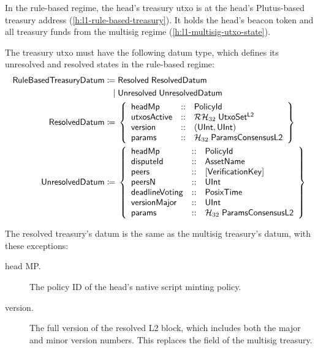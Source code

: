 \documentclass[../hydrozoa.tex]{subfiles}
\begin{document}
In the rule-based regime, the head's treasury utxo is at the head's Plutus-based treasury address (\cref{h:l1-rule-based-treasury}).
It holds the head's beacon token and all treasury funds from the multisig regime (\cref{h:l1-multisig-utxo-state}).

The treasury utxo must have the following datum type, which defines its unresolved and resolved states in the rule-based regime:
\begin{equation*}
\begin{split}
  \mathsf{RuleBasedTreasuryDatum} \coloneq&\;
    \mathsf{Resolved} \; \mathsf{ResolvedDatum} \\\mid&\;
    \mathsf{Unresolved} \; \mathsf{UnresolvedDatum} \\
  \mathsf{ResolvedDatum} \coloneq&\;\left\{
    \begin{array}{lll}
      \mathsf{headMp} &::& \mathsf{PolicyId} \\
      \mathsf{utxosActive}  &::& \mathcal{RH}_{32} \; \mathsf{UtxoSet^{L2}} \\
      \mathsf{version} &::& (\mathsf{UInt}, \mathsf{UInt}) \\
      \mathsf{params} &::& \mathcal{H}_{32} \; \mathsf{ParamsConsensusL2}
    \end{array}\right\} \\
  \mathsf{UnresolvedDatum} \coloneq&\;\left\{
    \begin{array}{lll}
      \mathsf{headMp} &::& \mathsf{PolicyId} \\
      \mathsf{disputeId} &::& \mathsf{AssetName} \\
      \mathsf{peers} &::& \mathsf{[VerificationKey]} \\
      \mathsf{peersN} &::& \mathsf{UInt} \\
      \mathsf{deadlineVoting} &::& \mathsf{PosixTime} \\
      \mathsf{versionMajor} &::& \mathsf{UInt} \\
      \mathsf{params} &::& \mathcal{H}_{32} \; \mathsf{ParamsConsensusL2}
    \end{array}\right\}
\end{split}
\end{equation*}

The resolved treasury's datum is the same as the multisig treasury's datum, with these exceptions:
\begin{description}
  \item[head MP.] The policy ID of the head's native script minting policy.
  \item[version.] The full version of the resolved L2 block, which includes both the major and minor version numbers.
  This replaces the  field of the multisig treasury.
\end{description}
\end{document}
